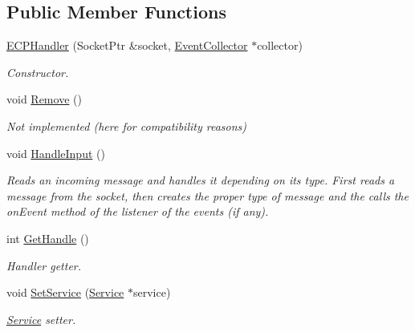 \subsection*{Public Member Functions}
\begin{DoxyCompactItemize}
\item 
\hypertarget{class_e_c_p_handler_abbb4765085c0b0e68882474214bd0336}{\hyperlink{class_e_c_p_handler_abbb4765085c0b0e68882474214bd0336}{E\-C\-P\-Handler} (Socket\-Ptr \&socket, \hyperlink{class_event_collector}{Event\-Collector} $\ast$collector)}\label{class_e_c_p_handler_abbb4765085c0b0e68882474214bd0336}

\begin{DoxyCompactList}\small\item\em Constructor. \end{DoxyCompactList}\item 
\hypertarget{class_e_c_p_handler_ac6fd0bc755f3dfe4bbac87c5c2be28be}{void \hyperlink{class_e_c_p_handler_ac6fd0bc755f3dfe4bbac87c5c2be28be}{Remove} ()}\label{class_e_c_p_handler_ac6fd0bc755f3dfe4bbac87c5c2be28be}

\begin{DoxyCompactList}\small\item\em Not implemented (here for compatibility reasons) \end{DoxyCompactList}\item 
\hypertarget{class_e_c_p_handler_ac0ca3a32612f0afc1323af8eb2af82c8}{void \hyperlink{class_e_c_p_handler_ac0ca3a32612f0afc1323af8eb2af82c8}{Handle\-Input} ()}\label{class_e_c_p_handler_ac0ca3a32612f0afc1323af8eb2af82c8}

\begin{DoxyCompactList}\small\item\em Reads an incoming message and handles it depending on its type. First reads a message from the socket, then creates the proper type of message and the calls the on\-Event method of the listener of the events (if any). \end{DoxyCompactList}\item 
int \hyperlink{class_e_c_p_handler_aae9a377a352483804795117312a72544}{Get\-Handle} ()
\begin{DoxyCompactList}\small\item\em Handler getter. \end{DoxyCompactList}\item 
void \hyperlink{class_e_c_p_handler_a52c29fb21cd3e665dc45a60bf55f2ed0}{Set\-Service} (\hyperlink{class_service}{Service} $\ast$service)
\begin{DoxyCompactList}\small\item\em \hyperlink{class_service}{Service} setter. \end{DoxyCompactList}\end{DoxyCompactItemize}


